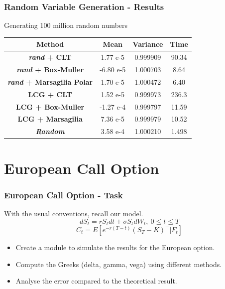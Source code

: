 \documentclass[12pt]{beamer}
\begin{document}
\begin{frame}
\frametitle{Random Variable Generation - Results}
Generating 100 million random numbers
\begin{center}
\begin{tabular}{| c| c| c| c| }
\hline
\textbf{ Method} &\textbf{ Mean} & \textbf{Variance}&\textbf{ Time} \\ \hline
\textbf{\textit{ rand}  + CLT} & 1.77 e-5 & 0.999909 & 90.34 \\  \hline
\textbf{\textit{ rand}  + Box-Muller} & -6.80 e-5 & 1.000703&8.64\\ \hline
\textbf{\textit{ rand}  + Marsagilia Polar} & 1.70 e-5& 1.000472& 6.40\\ \hline
\textbf{ LCG + CLT} & 1.52 e-5& 0.999973&236.3\\ \hline
\textbf{LCG + Box-Muller} & -1.27 e-4 & 0.999797&11.59\\ \hline
\textbf{ LCG + Marsagilia} & 7.36 e-5 & 0.999979&10.52\\ \hline
\textbf{\textit{Random} }& 3.58 e-4 & 1.000210&1.498\\ \hline

\end{tabular}
\end{center}

\end{frame}



\section{European Call Option}
\frame{\tableofcontents[currentsection]}
\begin{frame}
\frametitle{European Call Option - Task}

With the usual conventions, recall our model.
$$dS_t=rS_tdt+\sigma S_tdW_t, \ 0\leq t \leq T$$
$$C_t = E[e^{-r(T-t)}(S_T-K)^+|\textit{F}_t]$$

\begin{itemize}
  \item Create a module to simulate the results for the European option.
  \item Compute the Greeks (delta, gamma, vega) using different methods.
  \item Analyse the error compared to the theoretical result.
\end{itemize}
\end{frame}
\end{document}
